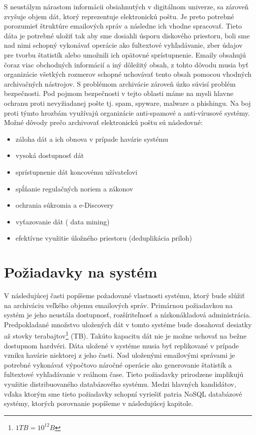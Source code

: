 \documentclass[11pt,twoside,a4paper]{book}
\begin{document}
S neustálym nárastom informácii obsiahnutých v digitálnom univerze, sa zároveň zvyšuje objem dát, ktorý reprezentuje elektronickú poštu. Je preto potrebné porozumieť štruktúre emailových správ a následne ich vhodne spracovať. Tieto dáta je potrebné uložiť tak aby sme dosiahli úsporu diskového priestoru, boli sme nad nimi schopný vykonávať operácie ako fultextové vyhľadávanie, zber údajov pre tvorbu štatistík alebo umožnili ich opätovné sprístupnenie. Emaily obsahujú čoraz viac obchodných informácií a iný dôležitý obsah, z tohto dôvodu musia byť organizácie všetkých rozmerov schopné uchovávať tento obsah pomocou vhodných archivačných nástrojov. S problémom archivácie zároveň úzko súvisí problém bezpečnosti. Pod pojmom bezpečnosti v tejto oblasti máme na mysli hlavne ochranu proti nevyžiadanej pošte tj. spam, spyware, malware a phishingu. Na boj proti týmto hrozbám využívajú organizácie anti-spamové a anti-vírusové systémy. Možné dôvody prečo archivovať elektronickú poštu sú následovné\cite{WhyArchiving}:
\begin{itemize}
 \item 
  záloha dát a ich obnova v prípade havárie systému
 \item
  vysoká dostupnosť dát
 \item
  sprístupnenie dát koncovému užívateľovi
 \item
  spĺňanie regulačných noriem a zákonov
 \item
  ochrania súkromia a e-Discovery
 \item
  vyťazovanie dát (  data mining)
 \item
  efektívne využitie úložného priestoru (deduplikácia príloh)
\end{itemize}


\section{Požiadavky na systém}

V následujúcej časti popíšeme požadované vlastnosti systému, ktorý bude slúžiť na archiváciu veľkého objemu emailových správ. Primárnou požiadavkou na systém je jeho neustála dostupnosť, rozšíriteľnosť a nízkonákladová administrácia. Predpokladané množstvo uložených dát v tomto systéme bude dosahovať desiatky až stovky terabajtov\footnote{$1 TB = 10^{12} B$} (TB). Takúto kapacitu dát nie je možne uchovať na bežne dostupnom hardvéri. Dáta uložené v systéme musia byť replikované v prípade vzniku havárie niektorej z jeho časti. Nad uloženými emailovými správami je potrebné vykonávať výpočtovo náročné operácie ako generovanie štatistík a fultextové vyhľadávanie v reálnom čase. Tieto požiadavky prirodzene implikujú využitie distribuovaného databázového systému. Medzi hlavných kandidátov, vďaka ktorým sme tieto požiadavky schopní vyriešiť patria NoSQL databázové systémy, ktorých porovnanie popíšeme v následujúcej kapitole.
\end{document}
